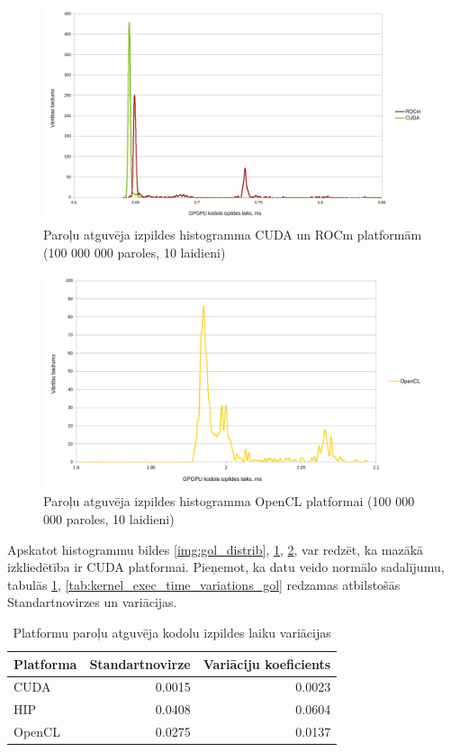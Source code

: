 \begin{figure}[H] \centering
    \includegraphics[width=\textwidth]{images/sha_distrib_cuda_rocm.png}
    \caption{Paroļu atguvēja izpildes histogramma CUDA un ROCm platformām (100
    000 000 paroles, 10 laidieni)} \label{img:sha_distrib}
\end{figure}


\begin{figure}[H] \centering
    \includegraphics[width=\textwidth]{images/sha_distrib_opencl.png}
    \caption{Paroļu atguvēja izpildes histogramma OpenCL platformai (100 000
    000 paroles, 10 laidieni)} \label{img:sha_distrib_cl}
\end{figure}

Apskatot histogrammu bildes \ref{img:gol_distrib}, \ref{img:sha_distrib},
\ref{img:sha_distrib_cl}, var redzēt, ka mazākā izkliedētība ir CUDA
platformai. Pieņemot, ka datu veido normālo sadalījumu, tabulās \ref{tab:kern},
\ref{tab:kernel_exec_time_variations_gol} redzamas atbilstošās Standartnovirzes
un variācijas.


\begin{table}[H]
    \centering
    \begin{tabular}{lrr}
    \hline
    \textbf{Platforma} & \textbf{Standartnovirze} & \textbf{Variāciju koeficients}\\ \hline
    CUDA    & 0.0015 & 0.0023 \\
    HIP     & 0.0408 & 0.0604  \\
    OpenCL  & 0.0275 & 0.0137 \\
    \hline
    \end{tabular}
    \caption{Platformu paroļu atguvēja kodolu izpildes laiku variācijas}
    \label{tab:kern} 
\end{table}


